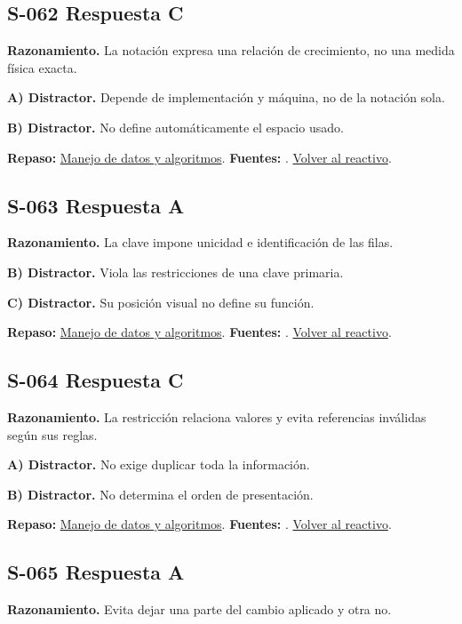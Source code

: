 \subsection*{S-062 \quad Respuesta C}\label{s:S-062}
\textbf{Razonamiento.} La notación expresa una relación de crecimiento, no una medida física exacta.

\textbf{A) Distractor. }Depende de implementación y máquina, no de la notación sola.

\textbf{B) Distractor. }No define automáticamente el espacio usado.

\textbf{Repaso:} \hyperref[sec:s3]{Manejo de datos y algoritmos}. \textbf{Fuentes:} \cite{algorithms,postgres,ai}. \hyperref[q:S-062]{Volver al reactivo}.\par\medskip

\subsection*{S-063 \quad Respuesta A}\label{s:S-063}
\textbf{Razonamiento.} La clave impone unicidad e identificación de las filas.

\textbf{B) Distractor. }Viola las restricciones de una clave primaria.

\textbf{C) Distractor. }Su posición visual no define su función.

\textbf{Repaso:} \hyperref[sec:s3]{Manejo de datos y algoritmos}. \textbf{Fuentes:} \cite{algorithms,postgres,ai}. \hyperref[q:S-063]{Volver al reactivo}.\par\medskip

\subsection*{S-064 \quad Respuesta C}\label{s:S-064}
\textbf{Razonamiento.} La restricción relaciona valores y evita referencias inválidas según sus reglas.

\textbf{A) Distractor. }No exige duplicar toda la información.

\textbf{B) Distractor. }No determina el orden de presentación.

\textbf{Repaso:} \hyperref[sec:s3]{Manejo de datos y algoritmos}. \textbf{Fuentes:} \cite{algorithms,postgres,ai}. \hyperref[q:S-064]{Volver al reactivo}.\par\medskip

\subsection*{S-065 \quad Respuesta A}\label{s:S-065}
\textbf{Razonamiento.} Evita dejar una parte del cambio aplicado y otra no.

